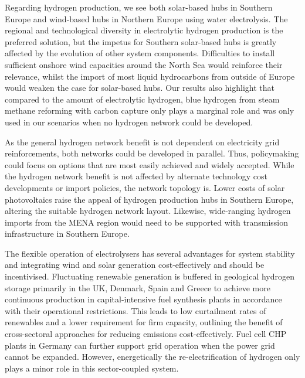 Regarding hydrogen production, we see both solar-based hubs in Southern Europe
and wind-based hubs in Northern Europe using water electrolysis. The regional
and technological diversity in electrolytic hydrogen production is the preferred
solution, but the impetus for Southern solar-based hubs is greatly affected by
the evolution of other system components. Difficulties to install sufficient
onshore wind capacities around the North Sea would reinforce their relevance,
whilst the import of most liquid hydrocarbons from outside of Europe would
weaken the case for solar-based hubs. Our results also highlight that compared
to the amount of electrolytic hydrogen, blue hydrogen from steam methane
reforming with carbon capture only plays a marginal role and was only used in
our scenarios when no hydrogen network could be developed.

As the general hydrogen network benefit is not dependent on electricity grid
reinforcements, both networks could be developed in parallel. Thus, policymaking
could focus on options that are most easily achieved and widely accepted. While
the hydrogen network benefit is not affected by alternate technology cost
developments or import policies, the network topology is. Lower costs of solar
photovoltaics raise the appeal of hydrogen production hubs in Southern Europe,
altering the suitable hydrogen network layout. Likewise, wide-ranging hydrogen
imports from the MENA region would need to be supported with transmission
infrastructure in Southern Europe.

The flexible operation of electrolysers has several advantages for system
stability and integrating wind and solar generation cost-effectively and should
be incentivised. Fluctuating renewable generation is buffered in geological
hydrogen storage primarily in the UK, Denmark, Spain and Greece to achieve more
continuous production in capital-intensive fuel synthesis plants in accordance
with their operational restrictions. This leads to low curtailment rates of
renewables and a lower requirement for firm capacity, outlining the benefit of
cross-sectoral approaches for reducing \co emissions cost-effectively. Fuel cell
CHP plants in Germany can further support grid operation when the power grid
cannot be expanded. However, energetically the re-electrification of hydrogen
only plays a minor role in this sector-coupled system.

